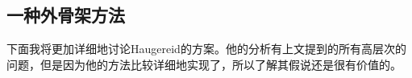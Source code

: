 \begin{exe}
\begin{xlist}[iv.]
\begin{exe}
\begin{xlist}[iv.]


\subsection{一种外骨架方法}
\label{Abschnitt-Diskussion-Haugereid}


下面我将更加详细地讨论Haugereid的方案\citeyearpar{Haugereid2007a}。他的分析有上文提到的所有高层次的问题，但是因为他的方法比较详细地实现了，所以了解其假说还是很有价值的。


\end{xlist}
\end{exe}
\end{xlist}
\end{exe}
